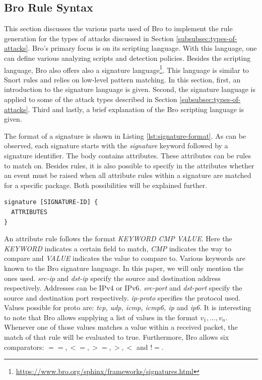 \subsection{Bro Rule Syntax}\label{subsec:bro-rule-syntax} 
This section discusses the various parts used of Bro to implement the rule generation for the types of attacks discussed in Section \ref{subsubsec:types-of-attacks}. Bro's primary focus is on its scripting language.  With this language, one can define various analyzing scripts and detection policies. Besides the scripting language, Bro also offers also a signature language\footnote{\url{https://www.bro.org/sphinx/frameworks/signatures.html}}. This language is similar to Snort rules and relies on low-level pattern matching. In this section, first, an introduction to the signature language is given. Second, the signature language is applied to some of the attack types described in Section \ref{subsubsec:types-of-attacks}. Third and lastly, a brief explanation of the Bro scripting language is given.


The format of a signature is shown in Listing \ref{lst:signature-format}. As can be observed, each signature starts with the \emph{signature} keyword followed by a signature identifier. The body contains attributes. These attributes can be rules to match on. Besides rules, it is also possible to specify in the attributes whether an event must be raised when all attribute rules within a signature are matched for a specific package. Both possibilities will be explained further. 

\begin{lstlisting}[caption={Bro Signature Format}, label={lst:signature-format}]
signature [SIGNATURE-ID] {
  ATTRIBUTES 
}
\end{lstlisting}

An attribute rule follows the format \emph{KEYWORD CMP VALUE}. Here the \emph{KEYWORD} indicates a certain field to match, \emph{CMP} indicates the way to compare and \emph{VALUE} indicates the value to compare to.  Various keywords are known to the Bro signature language. In this paper, we will only mention the ones used. \emph{src-ip} and \emph{dst-ip} specify the source and destination address respectively. Addresses can be IPv4 or IPv6. \emph{src-port} and \emph{dst-port} specify the source and destination port respectively. \emph{ip-proto} specifies the protocol used. Values possible for proto are: \emph{tcp, udp, icmp, icmp6, ip} and \emph{ip6}. It is interesting to note that Bro allows supplying a list of values in the format $v_1, \dots, v_n$. Whenever one of those values matches a value within a received packet, the match of that rule will be evaluated to true. Furthermore, Bro allows six comparators: $==, <=, >=, >, <$ and $!=$.

